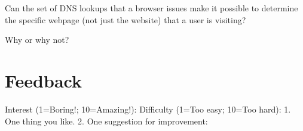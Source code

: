  Can the set of DNS lookups that a browser issues make it possible to determine
the specific webpage (not just the website) that a user is visiting?
\yesnoyes
\eprob

Why or why not? \\
\eprob

\pagebreak
\section*{Feedback}
\vspace*{-0.1in}
Interest (1=Boring!; 10=Amazing!):
Difficulty (1=Too easy; 10=Too hard):
\eprob
{}
1. One thing you like. 2. One suggestion for improvement:

\eprob

